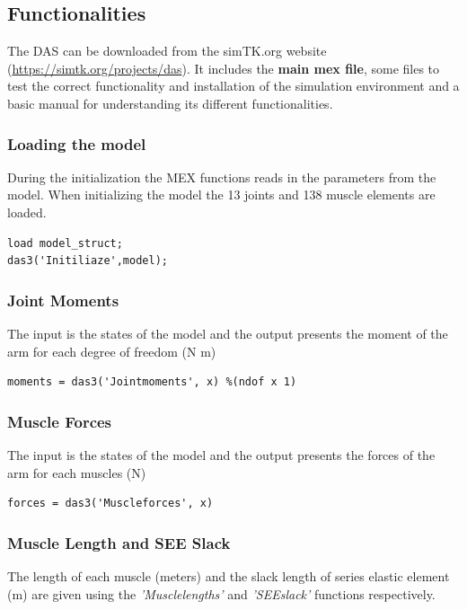 \subsection{Functionalities}

The DAS can be downloaded from the simTK.org website (\href{https://simtk.org/projects/das}{https://simtk.org/projects/das}). It includes the \textbf{main mex file}, some files to test the correct functionality and installation of the simulation environment and a basic manual for understanding its different functionalities. 

\subsubsection{Loading the model}

During the initialization the MEX functions reads in the parameters from the model. When initializing the model the 13 joints and 138 muscle elements are loaded.

\begin{lstlisting}[style=Matlab-editor]
load model_struct;
das3('Initiliaze',model);
\end{lstlisting}
\subsubsection{Joint Moments}
The input is the states of the model and the output presents the moment of the arm for each degree of freedom (N m)
\begin{lstlisting}[style=Matlab-editor]
moments = das3('Jointmoments', x) %(ndof x 1)
\end{lstlisting}

\subsubsection{Muscle Forces}
The input is the states of the model and the output presents the forces of the arm for each muscles (N)
\begin{lstlisting}[style=Matlab-editor]
forces = das3('Muscleforces', x)
\end{lstlisting}

\subsubsection{Muscle Length and SEE Slack}
The length of each muscle (meters) and the slack length of series elastic element (m) are given using the \textit{'Musclelengths'} and \textit{'SEEslack'} functions respectively. 

